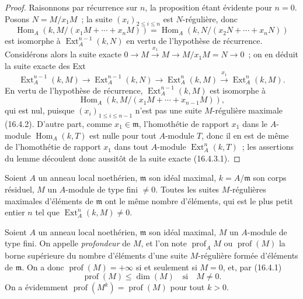 \begin{proof}
Raisonnons par récurrence sur $n$, la proposition étant évidente pour $n=0$.
Posons $N=M/x_1M$~; la suite $(x_i)_{2\leq i\leq n}$ est $N$-régulière, donc
\[
  \operatorname{Hom}_A(k,M/(x_1M+\cdots+x_nM))
  =\operatorname{Hom}_A(k,N/(x_2N+\cdots+x_nN))
\]
est isomorphe à $\operatorname{Ext}^{n-1}_A(k,N)$ en vertu de l'hypothèse de
récurrence. Considérons alors la suite exacte
$0\to M\xrightarrow{x_1}M\to M/x_1M=N\to0$~; on en déduit la suite exacte des
Ext
\begin{equation}
\label{0.16.4.3.1-fr}
\tag{16.4.3.1}
  \operatorname{Ext}^{n-1}_A(k,M)
  \to\operatorname{Ext}^{n-1}_A(k,N)
  \to\operatorname{Ext}^n_A(k,M)
  \xrightarrow{x_1}\operatorname{Ext}^n_A(k,M).
\end{equation}
En vertu de l'hypothèse de récurrence, $\operatorname{Ext}^{n-1}_A(k,M)$ est
isomorphe à
\[
  \operatorname{Hom}_A(k,M/(x_1M+\cdots+x_{n-1}M)),
\]
qui est nul, puisque $(x_i)_{1\leq i\leq n-1}$ n'est pas une suite
$M$-régulière maximale (16.4.2). D'autre part, comme
$x_1\in\mathfrak{m}$, l'homothétie de rapport $x_1$ dans le $A$-module
$\operatorname{Hom}_A(k,T)$ est nulle pour tout $A$-module $T$, donc il en est
de même de l'homothétie de rapport $x_1$ dans tout $A$-module
$\operatorname{Ext}^n_A(k,T)$~; les assertions du lemme découlent donc
aussitôt de la suite exacte (16.4.3.1).
\end{proof}

\begin{corollary}[16.4.4]
\label{0.16.4.4-fr}
Soient $A$ un anneau local noethérien, $\mathfrak{m}$ son idéal maximal,
$k=A/\mathfrak{m}$ son corps résiduel, $M$ un $A$-module de type fini
$\neq0$. Toutes les suites $M$-régulières maximales d'éléments de
$\mathfrak{m}$ ont le même nombre d'éléments, qui est le plus petit entier $n$
tel que $\operatorname{Ext}^n_A(k,M)\neq0$.
\end{corollary}

\begin{definition}[16.4.5]
\label{0.16.4.5-fr}
Soient $A$ un anneau local noethérien, $\mathfrak{m}$ son idéal maximal, $M$ un
$A$-module de type fini. On appelle \emph{profondeur} de $M$, et l'on note
$\operatorname{prof}_A M$ ou $\operatorname{prof}(M)$ la borne supérieure du
nombre d'éléments d'une suite $M$-régulière formée d'éléments de
$\mathfrak{m}$. On a donc $\operatorname{prof}(M)=+\infty$ si et seulement si
$M=0$, et, par (16.4.1)
\begin{equation}
\label{0.16.4.5.1-fr}
\tag{16.4.5.1}
  \operatorname{prof}(M)\leq\dim(M)\quad\text{si}\quad M\neq0.
\end{equation}
On a évidemment $\operatorname{prof}(M^k)=\operatorname{prof}(M)$ pour tout
$k>0$.
\end{definition}


